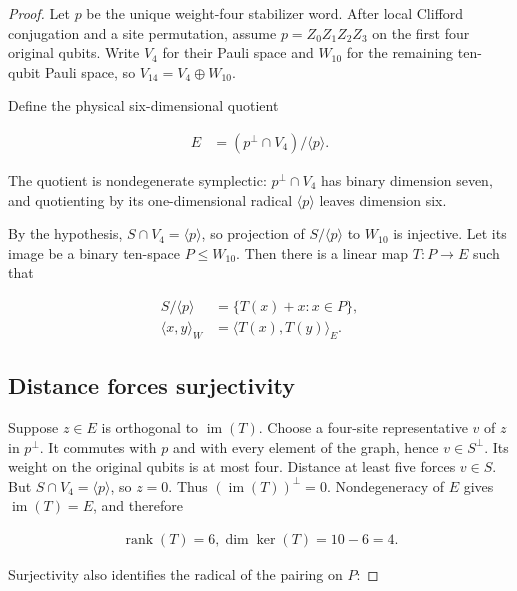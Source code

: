 \documentclass[11pt]{article}
\begin{document}
\begin{proof}

Let \(p\) be the unique weight-four stabilizer word. After local Clifford conjugation and a site permutation, assume \(p=Z_{0}Z_{1}Z_{2}Z_{3}\) on the first four original qubits. Write \(V_{4}\) for their Pauli space and \(W_{10}\) for the remaining ten-qubit Pauli space, so \(V_{14}=V_{4} \oplus W_{10}\).

Define the physical six-dimensional quotient

\[
\begin{aligned}
E &=(p^\perp \cap V_{4}) / \langle p \rangle.
\end{aligned}
\]

The quotient is nondegenerate symplectic: \(p^\perp \cap V_{4}\) has binary dimension seven, and quotienting by its one-dimensional radical \(\langle p \rangle\) leaves dimension six.

By the hypothesis, \(S \cap V_{4}=\langle p \rangle\), so projection of \(S/\langle p \rangle\) to \(W_{10}\) is injective. Let its image be a binary ten-space \(P \le W_{10}\). Then there is a linear map \(T:P\to E\) such that

\[
\begin{aligned}
S/\langle p \rangle &=\{ T(x)+x : x \in P \}, \\
\langle x,y \rangle_{W} &=\langle T(x),T(y) \rangle_{E}.
\end{aligned}
\]

\subsection{Distance forces surjectivity}\label{distance-forces-surjectivity}

Suppose \(z \in E\) is orthogonal to \(\operatorname{im}(T)\). Choose a four-site representative \(v\) of \(z\) in \(p^\perp\). It commutes with \(p\) and with every element of the graph, hence \(v \in S^\perp\). Its weight on the original qubits is at most four. Distance at least five forces \(v \in S\). But \(S \cap V_{4}=\langle p \rangle\), so \(z=0\). Thus \((\operatorname{im}(T))^\perp=0\). Nondegeneracy of \(E\) gives \(\operatorname{im}(T)=E\), and therefore

\[
\begin{aligned}
\operatorname{rank}(T)=6,   \dim \operatorname{ker}(T)=10-6=4.
\end{aligned}
\]

Surjectivity also identifies the radical of the pairing on \(P\):


\end{proof}
\end{document}
